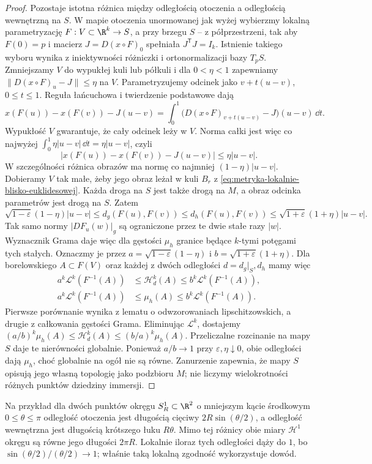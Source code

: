 \begin{proof}
Pozostaje istotna różnica między odległością otoczenia
a odległością wewnętrzną na $S$. W mapie otoczenia
unormowanej jak wyżej wybierzmy lokalną parametryzację
$F:V\subset\R^k\to S$, a przy brzegu $S$ -- z półprzestrzeni,
tak aby $F(0)=p$ i macierz $J=D(x\circ F)_0$ spełniała
$J^{\mathsf T}J=I_k$. Istnienie takiego wyboru wynika
z iniektywności różniczki i ortonormalizacji bazy $T_pS$.
Zmniejszamy $V$ do wypukłej kuli lub półkuli i dla
$0<\eta<1$ zapewniamy
$\|D(x\circ F)_u-J\|\leq\eta$ na $V$.
Parametryzujemy odcinek jako $v+t(u-v)$, $0\leq t\leq1$.
Reguła łańcuchowa i twierdzenie podstawowe dają
\[
 x(F(u))-x(F(v))-J(u-v)
 =\int_0^1
 \bigl(D(x\circ F)_{v+t(u-v)}-J\bigr)(u-v)\,\dd t.
\]
Wypukłość $V$ gwarantuje, że cały odcinek leży w $V$.
Norma całki jest więc co najwyżej
$\int_0^1\eta|u-v|\,\dd t=\eta|u-v|$, czyli
\[
 |x(F(u))-x(F(v))-J(u-v)|\leq\eta|u-v|.
\]
W szczególności różnica obrazów ma normę co najmniej
$(1-\eta)|u-v|$. Dobieramy $V$ tak małe, żeby jego
obraz leżał w kuli $B_r$ z
\eqref{eq:metryka-lokalnie-blisko-euklidesowej}.
Każda droga na $S$ jest także drogą na $M$, a obraz
odcinka parametrów jest drogą na $S$. Zatem
\[
 \sqrt{1-\varepsilon}(1-\eta)|u-v|
 \leq d_g(F(u),F(v))
 \leq d_h(F(u),F(v))
 \leq\sqrt{1+\varepsilon}(1+\eta)|u-v|.
\]
Tak samo normy $|D F_u(w)|_g$ są ograniczone przez
te dwie stałe razy $|w|$. Wyznacznik Grama daje więc
dla gęstości $\mu_h$ granice będące $k$-tymi potęgami
tych stałych. Oznaczmy je przez
$a=\sqrt{1-\varepsilon}(1-\eta)$
i $b=\sqrt{1+\varepsilon}(1+\eta)$.
Dla borelowskiego $A\subset F(V)$ oraz każdej
z dwóch odległości $d=d_g|_S,d_h$ mamy więc
\begin{align*}
 a^k\mathcal L^k(F^{-1}(A))
 &\leq\mathcal H^k_d(A)
 \leq b^k\mathcal L^k(F^{-1}(A)),\\
 a^k\mathcal L^k(F^{-1}(A))
 &\leq\mu_h(A)
 \leq b^k\mathcal L^k(F^{-1}(A)).
\end{align*}
Pierwsze porównanie wynika z lematu o odwzorowaniach
lipschitzowskich, a drugie z całkowania gęstości Grama.
Eliminując $\mathcal L^k$, dostajemy
$(a/b)^k\mu_h(A)\leq\mathcal H^k_d(A)\leq(b/a)^k\mu_h(A)$.
Przeliczalne rozcinanie na mapy $S$ daje te nierówności
globalnie. Ponieważ $a/b\to1$ przy
$\varepsilon,\eta\downarrow0$, obie odległości dają
$\mu_h$, choć globalnie na ogół nie są równe.
Zanurzenie zapewnia, że mapy $S$ opisują jego własną
topologię jako podzbioru $M$; nie liczymy wielokrotności
różnych punktów dziedziny immersji.
\end{proof}

Na przykład dla dwóch punktów okręgu $S_R^1\subset\R^2$
o mniejszym kącie środkowym $0\leq\theta\leq\pi$
odległość otoczenia jest długością cięciwy
$2R\sin(\theta/2)$, a odległość wewnętrzna jest
długością krótszego łuku $R\theta$.
Mimo tej różnicy obie miary $\mathcal H^1$ okręgu
są równe jego długości $2\pi R$.
Lokalnie iloraz tych odległości dąży do $1$,
bo $\sin(\theta/2)/(\theta/2)\to1$;
właśnie taką lokalną zgodność wykorzystuje dowód.

